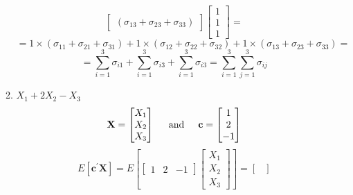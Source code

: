 \begin{enumerate}[font=\bfseries]
\begin{enumerate}
\[\begin{bmatrix}
                    \left(\sigma_{13} + \sigma_{23} + \sigma_{33}\right)
                \end{bmatrix}
                \begin{bmatrix}
                    1 \\
                    1 \\
                    1
                \end{bmatrix}
                =
            \]
            \[
                =
                1 \times \left(\sigma_{11} + \sigma_{21} + \sigma_{31}\right) + 1 \times \left(\sigma_{12} + \sigma_{22} + \sigma_{32}\right)
                    + 1 \times \left(\sigma_{13} + \sigma_{23} + \sigma_{33}\right)
                =
            \]
            \[
                =
                \sum_{i=1}^3{\sigma_{i1}} + \sum_{i=1}^3{\sigma_{i3}} + \sum_{i=1}^3{\sigma_{i3}}
                =
                \sum_{i=1}^3{\sum_{j=1}^3{\sigma_{ij}}}
            \]
            \item $X_1 + 2X_2 - X_3$
            \[
                \textbf{X}
                =
                \begin{bmatrix}
                    X_1 \\
                    X_2 \\
                    X_3
                \end{bmatrix}
                \hspace{0.2in}\text{and}\hspace{0.2in}
                \textbf{c}
                =
                \begin{bmatrix}
                    1 \\
                    2 \\
                    -1
                \end{bmatrix}
            \]
            \[
                E\left[\textbf{c}^\prime\textbf{X}\right]
                =
                E\left[
                \begin{bmatrix}
                    1 & 2 & -1
                \end{bmatrix}
                    \begin{bmatrix}
                    X_1 \\
                    X_2 \\
                    X_3
                \end{bmatrix}
                \right]
                =
                \begin{bmatrix}

\end{bmatrix}\]
\end{enumerate}
\end{enumerate}
